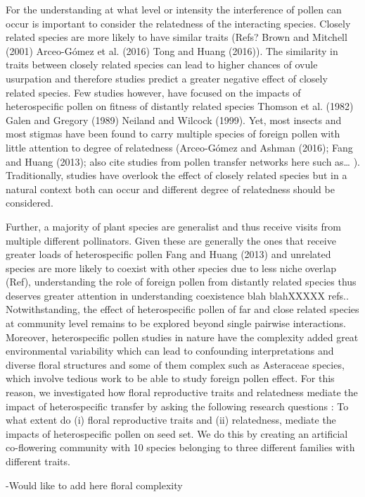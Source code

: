 \documentclass[11pt,a4paper]{article}
\begin{document}
For the understanding at what level or intensity the interference of
pollen can occur is important to consider the relatedness of the
interacting species. Closely related species are more likely to have
similar traits (Refs? Brown and Mitchell (2001) Arceo-Gómez et al.
(2016) Tong and Huang (2016)). The similarity in traits between closely
related species can lead to higher chances of ovule usurpation and
therefore studies predict a greater negative effect of closely related
species. Few studies however, have focused on the impacts of
heterospecific pollen on fitness of distantly related species Thomson et
al. (1982) Galen and Gregory (1989) Neiland and Wilcock (1999). Yet,
most insects and most stigmas have been found to carry multiple species
of foreign pollen with little attention to degree of relatedness
(Arceo-Gómez and Ashman (2016); Fang and Huang (2013); also cite studies
from pollen transfer networks here such as\ldots{} ). Traditionally,
studies have overlook the effect of closely related species but in a
natural context both can occur and different degree of relatedness
should be considered.

Further, a majority of plant species are generalist and thus receive
visits from multiple different pollinators. Given these are generally
the ones that receive greater loads of heterospecific pollen Fang and
Huang (2013) and unrelated species are more likely to coexist with other
species due to less niche overlap (Ref), understanding the role of
foreign pollen from distantly related species thus deserves greater
attention in understanding coexistence blah blahXXXXX refs..
Notwithstanding, the effect of heterospecific pollen of far and close
related species at community level remains to be explored beyond single
pairwise interactions. Moreover, heterospecific pollen studies in nature
have the complexity added great environmental variability which can lead
to confounding interpretations and diverse floral structures and some of
them complex such as Asteraceae species, which involve tedious work to
be able to study foreign pollen effect. For this reason, we investigated
how floral reproductive traits and relatedness mediate the impact of
heterospecific transfer by asking the following research questions : To
what extent do (i) floral reproductive traits and (ii) relatedness,
mediate the impacts of heterospecific pollen on seed set. We do this by
creating an artificial co-flowering community with 10 species belonging
to three different families with different traits.

-Would like to add here floral complexity
\end{document}
